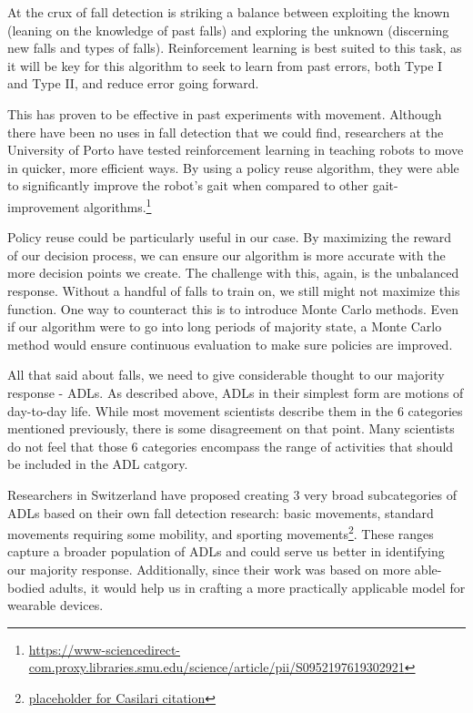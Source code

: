 \documentclass{llncs}
\begin{document}
	At the crux of fall detection is striking a balance between exploiting the known (leaning on the knowledge of past falls) and exploring the unknown (discerning new falls and types of falls). Reinforcement learning is best suited to this task, as it will be key for this algorithm to seek to learn from past errors, both Type I and Type II, and reduce error going forward.
	
	This has proven to be effective in past experiments with movement. Although there have been no uses in fall detection that we could find, researchers at the University of Porto have tested reinforcement learning in teaching robots to move in quicker, more efficient ways. By using a policy reuse algorithm, they were able to significantly improve the robot's gait when compared to other gait-improvement algorithms.\footnote{\url{https://www-sciencedirect-com.proxy.libraries.smu.edu/science/article/pii/S0952197619302921}}
	
	Policy reuse could be particularly useful in our case. By maximizing the reward of our decision process, we can ensure our algorithm is more accurate with the more decision points we create. The challenge with this, again, is the unbalanced response. Without a handful of falls to train on, we still might not maximize this function. One way to counteract this is to introduce Monte Carlo methods. Even if our algorithm were to go into long periods of majority state, a Monte Carlo method would ensure continuous evaluation to make sure policies are improved.
	
	All that said about falls, we need to give considerable thought to our majority response - ADLs. As described above, ADLs in their simplest form are motions of day-to-day life. While most movement scientists describe them in the 6 categories mentioned previously, there is some disagreement on that point. Many scientists do not feel that those 6 categories encompass the range of activities that should be included in the ADL catgory.
	
	Researchers in Switzerland have proposed creating 3 very broad subcategories of ADLs based on their own fall detection research: basic movements, standard movements requiring some mobility, and sporting movements\footnote{\url{placeholder for Casilari citation}}. These ranges capture a broader population of ADLs and could serve us better in identifying our majority response. Additionally, since their work was based on more able-bodied adults, it would help us in crafting a more practically applicable model for wearable devices.
	
\end{document}
